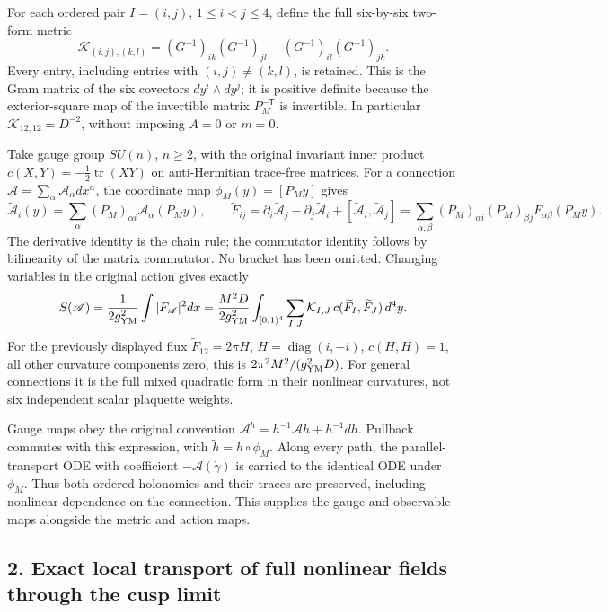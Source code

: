 \documentclass[
  11pt,
]{article}
\begin{document}
For each ordered pair \(I=(i,j)\), \(1\leq i<j\leq4\), define the full
six-by-six two-form metric \[
\mathcal K_{(i,j),(k,l)}=(G^{-1})_{ik}(G^{-1})_{jl}
                         -(G^{-1})_{il}(G^{-1})_{jk}.
\] Every entry, including entries with \((i,j)\ne(k,l)\), is retained.
This is the Gram matrix of the six covectors \(dy^i\wedge dy^j\); it is
positive definite because the exterior-square map of the invertible
matrix \(P_M^{-\mathsf T}\) is invertible. In particular
\(\mathcal K_{12,12}=D^{-2}\), without imposing \(A=0\) or \(m=0\).

Take gauge group \(SU(n)\), \(n\geq2\), with the original invariant
inner product \(c(X,Y)=-\tfrac12\operatorname{tr}(XY)\) on
anti-Hermitian trace-free matrices. For a connection
\(\mathscr A=\sum_\alpha
\mathscr A_\alpha dx^\alpha\), the coordinate map \(\phi_M(y)=[P_My]\)
gives \[
 \widetilde{\mathscr A}_i(y)=\sum_\alpha(P_M)_{\alpha i}
                       \mathscr A_\alpha(P_My),\qquad
 \widetilde F_{ij}=\partial_i\widetilde{\mathscr A}_j
  -\partial_j\widetilde{\mathscr A}_i
  +[\widetilde{\mathscr A}_i,\widetilde{\mathscr A}_j]
 =\sum_{\alpha,\beta}(P_M)_{\alpha i}(P_M)_{\beta j}
                       F_{\alpha\beta}(P_My).
\] The derivative identity is the chain rule; the commutator identity
follows by bilinearity of the matrix commutator. No bracket has been
omitted. Changing variables in the original action gives exactly \[
 S(\mathscr A)=\frac1{2g_{\rm YM}^2}\int |F_{\mathscr A}|^2dx
 =\frac{M^2D}{2g_{\rm YM}^2}\int_{[0,1)^4}
   \sum_{I,J}\mathcal K_{I,J}\,c(\widetilde F_I,\widetilde F_J)\,d^4y.
\] For the previously displayed flux \(\widetilde F_{12}=2\pi H\),
\(H=\operatorname{diag}(i,-i)\), \(c(H,H)=1\), all other curvature
components zero, this is \(2\pi^2M^2/(g_{\rm YM}^2D)\). For general
connections it is the full mixed quadratic form in their nonlinear
curvatures, not six independent scalar plaquette weights.

Gauge maps obey the original convention
\(\mathscr A^h=h^{-1}\mathscr A h+h^{-1}dh\). Pullback commutes with
this expression, with \(\widetilde h=h\circ\phi_M\). Along every path,
the parallel-transport ODE with coefficient \(-\mathscr A(\dot\gamma)\)
is carried to the identical ODE under \(\phi_M\). Thus both ordered
holonomies and their traces are preserved, including nonlinear
dependence on the connection. This supplies the gauge and observable
maps alongside the metric and action maps.

\subsection{2. Exact local transport of full nonlinear fields through
the cusp
limit}\label{exact-local-transport-of-full-nonlinear-fields-through-the-cusp-limit}
\end{document}
